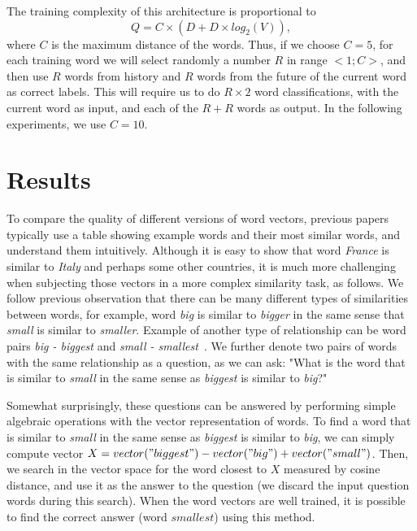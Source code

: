 \documentclass{article} %
\begin{document}
The training complexity of this architecture is proportional to
\begin{equation}
Q = C \times (D + D \times log_{2}(V)),
\end{equation}
where $C$ is the maximum distance of the words. Thus, if we choose $C=5$, for each training word we will select randomly a number $R$ in range $<1 ; C>$, and then use $R$ words from history and $R$ words
from the future of the current word as correct labels. This will require us to do $R \times 2$ word classifications, with the current word as input, and each of the $R + R$ words as output.
In the following experiments, we use $C=10$.

\section{Results}

To compare the quality of different versions of word vectors, previous papers typically use a table showing example words and their most similar words, and understand them intuitively.
Although it is easy to show that word {\it France} is similar to {\it Italy} and perhaps some other countries, it is much more challenging when subjecting those vectors in a more complex similarity task, as follows.
We follow previous observation that there can be many different types of similarities between words, for example, word {\it big} is similar to {\it bigger} in the same sense that
{\it small} is similar to {\it smaller}. Example of another type of relationship can be word pairs {\it big - biggest} and {\it small - smallest}~\cite{NAACL1}. We further denote two pairs of words with the same relationship
as a question, as we can ask: "What is the word that is similar to {\it small} in the same sense as {\it biggest} is similar to {\it big}?"

Somewhat surprisingly, these questions can be answered
by performing simple algebraic operations with the vector representation of words. To find a word that is similar to {\it small} in the same sense as {\it biggest} is similar to {\it big}, we can simply compute
vector $X = vector("biggest") - vector("big") + vector("small")$. Then, we search in the vector space for the word closest to $X$ measured by cosine distance, and use it as the answer to the question (we discard the input
question words during this search).
When the word vectors are well trained, it is possible to find the correct answer (word $smallest$) using this method.%
\end{document}

